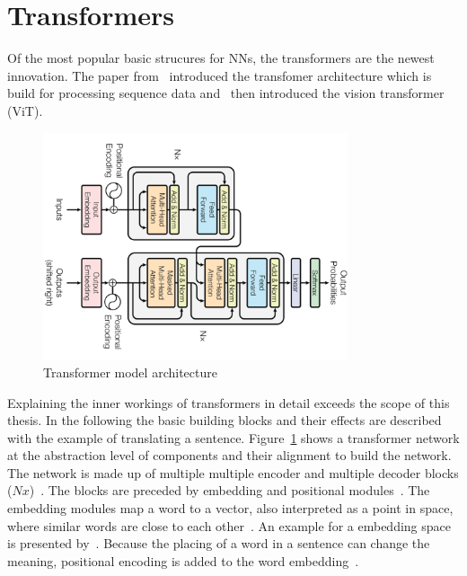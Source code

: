 \section{Transformers}
Of the most popular basic strucures for \acp{NN}, the transformers are the newest innovation.
The paper from~\cite{vaswani_attention_2017} introduced the transfomer architecture which is
build for processing sequence data and~\cite{dosovitskiy_image_2021} then introduced the vision
transformer (ViT).
\begin{figure}[ht]
    \centering
    \includegraphics[width=0.8\textwidth]{img/Transformer-Vaswani-Attention-2017.png}
    \caption[Transformer architecture]{%
        Transformer model architecture~\citep{vaswani_attention_2017}\label{fig:transformer}
    }
\end{figure}
Explaining the inner workings of transformers in detail exceeds the scope of this thesis.
In the following the basic building blocks and their effects are described with the example of
translating a sentence.
Figure~\ref{fig:transformer} shows a transformer network at the abstraction level of components and
their alignment to build the network.
The network is made up of multiple multiple encoder and multiple decoder
blocks ($Nx$)~\citep{vaswani_attention_2017}.
The blocks are preceded by embedding and positional modules~\citep{vaswani_attention_2017}.
The embedding modules map a word to a vector, also interpreted as a point in space, where similar
words are close to each other~\citep{vaswani_attention_2017}.
An example for a embedding space is presented by~\cite{pennington_glove_2014}.
Because the placing of a word in a sentence can change the meaning, positional
encoding is added to the word embedding~\citep{vaswani_attention_2017}.
